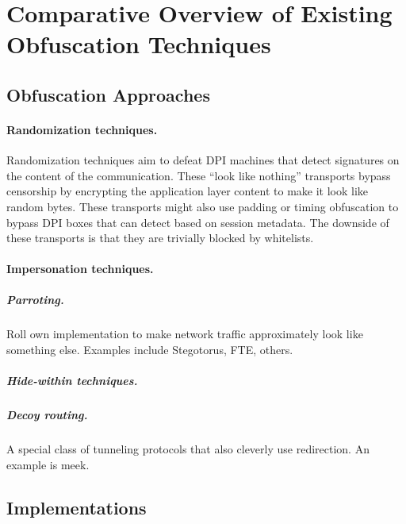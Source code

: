 %
\section{Comparative Overview of Existing Obfuscation Techniques}
\label{section:comparison} 

\subsection{Obfuscation Approaches}

\paragraph{Randomization techniques.}

Randomization techniques aim to defeat DPI machines that detect
signatures on the content of the communication. These ``look like
nothing'' transports bypass censorship by encrypting the application
layer content to make it look like random bytes. These transports
might also use padding or timing obfuscation to bypass DPI boxes that
can detect based on session metadata. The downside of these transports
is that they are trivially blocked by whitelists.


\paragraph{Impersonation techniques.}

\subparagraph{Parroting.} 	Roll own implementation to make network traffic
approximately look like something else. Examples include Stegotorus, FTE,
others.

\subparagraph{Hide-within techniques.}

\subparagraph{Decoy routing.} 
A special class of tunneling protocols that also cleverly use redirection. An
example is meek. 




\subsection{Implementations}



